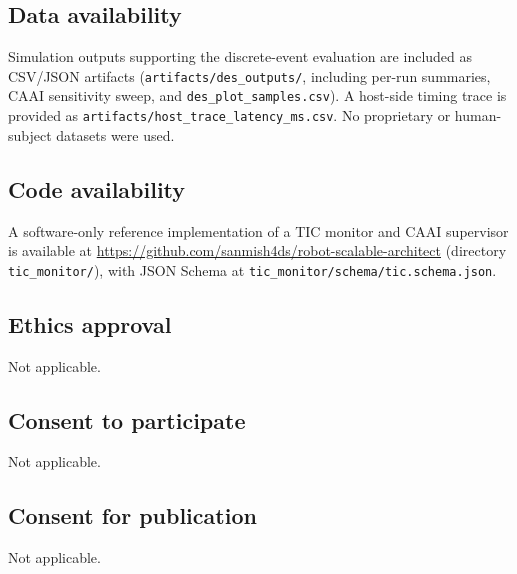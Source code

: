 \documentclass[11pt]{article}
\begin{document}
\subsection*{Data availability}
Simulation outputs supporting the discrete-event evaluation are included as CSV/JSON
artifacts (\texttt{artifacts/des\_outputs/}, including per-run summaries, CAAI sensitivity
sweep, and \texttt{des\_plot\_samples.csv}). A host-side timing trace is provided as
\texttt{artifacts/host\_trace\_latency\_ms.csv}. No proprietary or human-subject datasets
were used.

\subsection*{Code availability}
A software-only reference implementation of a TIC monitor and CAAI supervisor is available at
\url{https://github.com/sanmish4ds/robot-scalable-architect} (directory \texttt{tic\_monitor/}),
with JSON Schema at \texttt{tic\_monitor/schema/tic.schema.json}.

\subsection*{Ethics approval}
Not applicable.

\subsection*{Consent to participate}
Not applicable.

\subsection*{Consent for publication}
Not applicable.
\end{document}
